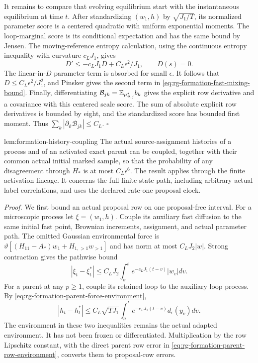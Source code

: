 It remains to compare that evolving equilibrium start with the
instantaneous equilibrium at time $t$. After standardizing
$(w_1,h)$ by $\sqrt{J_1/T}$, its normalized parameter score is a
centered quadratic with uniform exponential moments.
The loop-marginal score is its conditional expectation and has the
same bound by Jensen. The moving-reference entropy calculation,
using the continuous entropy inequality with curvature $c_LJ_1$,
gives
\begin{equation}
 D'\le-c_LJ_1D+C_L\epsilon^2/J_1,\qquad D(s)=0.
 \label{eq:rg-formation-fast-equilibrium-lag}
\end{equation}
The linear-in-$D$ parameter term is absorbed for small $\epsilon$.
It follows that $D\le C_L\epsilon^2/J_1^2$, and Pinsker gives the
second term in \cref{eq:rg-formation-fast-mixing-bound}.
Finally, differentiating
$\mathcal B_{jk}=\mathbb E_{\mu_{\vartheta,j}^*}b_k$ gives the explicit
row derivative and a covariance with this centered scale score.
The sum of absolute explicit row derivatives is bounded by eight,
and the standardized score has bounded first moment. Thus
$\sum_k|\partial_\vartheta\mathcal B_{jk}|\le C_L$.
\hfill$\square$

{lem:formation-history-coupling}
The actual source-assignment histories of a process and of an
activated exact parent can be coupled, together with their common
actual initial marked sample, so that the probability of any
disagreement through $H_*$ is at most $C_L\epsilon^6$.
The result applies through the finite activation lineage. It concerns
the full finite-state path, including arbitrary actual label
correlations, and uses the declared rate-one proposal clock.

\emph{Proof.}
We first bound an actual proposal row on one proposal-free interval.
For a microscopic process let $\xi=(w_1,h)$. Couple its auxiliary
fast diffusion to the same initial fast point, Brownian increments,
assignment, and actual parameter path. The omitted Gaussian
environmental force is
$\vartheta[(H_{11}-A_*)w_1+H_{1,>1}w_{>1}]$ and has norm at most
$C_LJ_2|w|$. Strong contraction gives the pathwise bound
\begin{equation}
 |\xi_t-\xi_t^*|
 \le C_LJ_2\int_\sigma^t
             e^{-c_LJ_1(t-v)}|w_v|dv.
 \label{eq:rg-formation-fast-environment-coupling}
\end{equation}
For a parent at any $p\ge1$, couple its retained loop to the
auxiliary loop process. By
\cref{eq:rg-formation-parent-force-environment},
\begin{equation}
 |h_t-h_t^*|
 \le C_L\sqrt{TJ_1}
       \int_\sigma^t e^{-c_LJ_1(t-v)}d_\epsilon(y_v)dv.
 \label{eq:rg-formation-loop-environment-coupling}
\end{equation}
The environment in these two inequalities remains the actual
adapted environment. It has not been frozen or differentiated.
Multiplication by the row Lipschitz constant, with the direct
parent row error in
\cref{eq:rg-formation-parent-row-environment}, converts them to
proposal-row errors.

